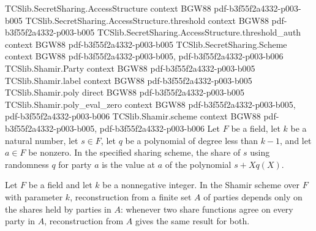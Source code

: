 \begin{theorem}
\label{TCSlib.Shamir.scheme_share}
\leanok
\proofstep
  {TCSlib.SecretSharing.AccessStructure}
  {context}
  {BGW88}
  {pdf-b3f55f2a4332-p003-b005}
\proofstep
  {TCSlib.SecretSharing.AccessStructure.threshold}
  {context}
  {BGW88}
  {pdf-b3f55f2a4332-p003-b005}
\proofstep
  {TCSlib.SecretSharing.AccessStructure.threshold_auth}
  {context}
  {BGW88}
  {pdf-b3f55f2a4332-p003-b005}
\proofstep
  {TCSlib.SecretSharing.Scheme}
  {context}
  {BGW88}
  {pdf-b3f55f2a4332-p003-b005,
    pdf-b3f55f2a4332-p003-b006}
\proofstep
  {TCSlib.Shamir.Party}
  {context}
  {BGW88}
  {pdf-b3f55f2a4332-p003-b005}
\proofstep
  {TCSlib.Shamir.label}
  {context}
  {BGW88}
  {pdf-b3f55f2a4332-p003-b005}
\proofstep
  {TCSlib.Shamir.poly}
  {direct}
  {BGW88}
  {pdf-b3f55f2a4332-p003-b005}
\proofstep
  {TCSlib.Shamir.poly_eval_zero}
  {context}
  {BGW88}
  {pdf-b3f55f2a4332-p003-b005,
    pdf-b3f55f2a4332-p003-b006}
\proofstep
  {TCSlib.Shamir.scheme}
  {context}
  {BGW88}
  {pdf-b3f55f2a4332-p003-b005,
    pdf-b3f55f2a4332-p003-b006}
Let $F$ be a field, let $k$ be a natural number, let $s\in F$, let $q$ be a polynomial
of degree less than $k-1$, and let $a\in F$ be nonzero. In the specified sharing scheme,
the share of $s$ using randomness $q$ for party $a$ is the value at $a$ of the
polynomial $s+Xq(X)$.
\end{theorem}

\begin{theorem}
\label{TCSlib.Shamir.localReconstruct}
\leanok
{}
Let $F$ be a field and let $k$ be a nonnegative integer. In the Shamir scheme over $F$
with parameter $k$, reconstruction from a finite set $A$ of parties depends only on the
shares held by parties in $A$: whenever two share functions agree on every party in $A$,
reconstruction from $A$ gives the same result for both.
\end{theorem}


